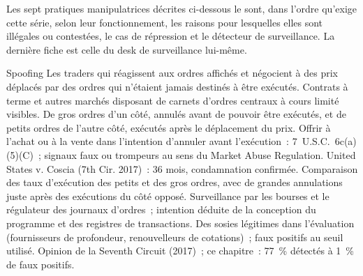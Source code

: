 Les sept pratiques manipulatrices décrites ci-dessous le sont, dans l'ordre qu'exige cette série, selon leur fonctionnement, les raisons pour lesquelles elles sont illégales ou contestées, le
cas de répression et le détecteur de surveillance. La dernière fiche est celle du desk de surveillance lui-même.

\begin{strategyfile}{Spoofing}\label{strat:s2:manipulative-strategies-and-how-they-are-caught:spoofing}
 Les traders qui réagissent aux ordres affichés et négocient à des prix déplacés par des ordres qui n'étaient jamais destinés à être exécutés.
 Contrats à terme et autres marchés disposant de carnets d'ordres centraux à cours limité visibles.
 De gros ordres d'un côté, annulés avant de pouvoir être exécutés, et de petits ordres de l'autre côté, exécutés après le déplacement du prix.
 Offrir à l'achat ou à la vente dans l'intention d'annuler avant l'exécution~: 7~U.S.C.~6c(a)(5)(C)~; signaux faux ou trompeurs au sens du
Market Abuse Regulation.
 United States v. Coscia (7th Cir. 2017)~: 36 mois, condamnation confirmée.
 Comparaison des taux d'exécution des petits et des gros ordres, avec de grandes annulations juste après des exécutions du côté opposé.
 Surveillance par les bourses et le régulateur des journaux d'ordres~; intention déduite de la conception du programme et des registres de transactions.
 Des sosies légitimes dans l'évaluation (fournisseurs de profondeur, renouvelleurs de cotations)~; faux positifs au
seuil utilisé.
 Opinion de la Seventh Circuit (2017)~; ce chapitre~: 77~\% détectés à 1~\% de faux positifs.
\end{strategyfile}

